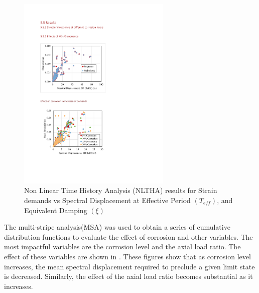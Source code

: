 \begin{figure}[htbp]
	\centering
	\includegraphics[width=0.65\textwidth]{VAC Thesis 2.0/Chapter-5/figs/All_results_NLTHA_Figure.pdf}
	\caption{Non Linear Time History Analysis (NLTHA) results for Strain demands vs Spectral Displacement at Effective Period $(T_{eff})$, and Equivalent Damping $(\xi)$}
	\label{fig:all_results_nltha}
\end{figure}

The multi-stripe analysis(MSA) was used to obtain a series of cumulative distribution functions to evaluate the effect of corrosion and other variables. The most impactful variables are the corrosion level and the axial load ratio. The effect of these variables are shown in . These figures show that as corrosion level increases, the mean spectral displacement required to preclude a given limit state is decreased. Similarly, the effect of the axial load ratio becomes substantial as it increases.

